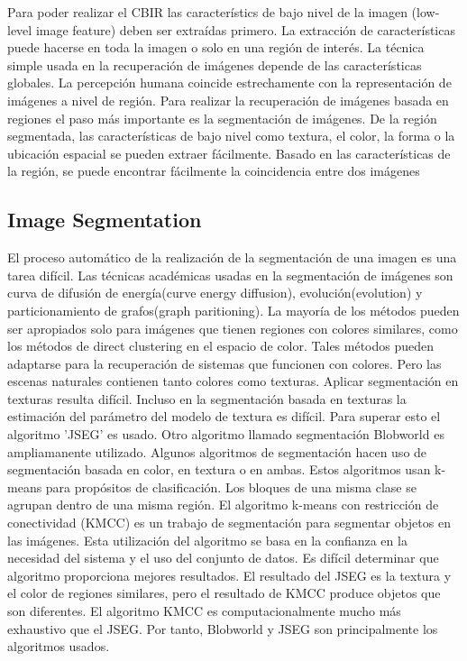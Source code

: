 \documentclass{llncs}
\begin{document}
Para poder realizar el CBIR las caracter\'istics de bajo nivel de la imagen  (low-level image feature) deben ser extra\'idas 
primero. La extracci\'on de caracter\'isticas puede hacerse en toda la imagen o solo en una regi\'on de inter\'es. La t\'ecnica
simple usada en la recuperaci\'on de im\'agenes depende de las caracter\'isticas globales. La percepci\'on humana coincide 
estrechamente con la representaci\'on de im\'agenes a nivel de regi\'on. Para realizar la recuperaci\'on de im\'agenes 
basada en regiones el paso m\'as importante es la segmentaci\'on de im\'agenes. De la regi\'on segmentada, las caracter\'isticas 
de bajo nivel como textura, el color, la forma o la ubicaci\'on espacial se pueden extraer f\'acilmente. Basado en las caracter\'isticas
de la regi\'on, se puede encontrar f\'acilmente la coincidencia entre dos im\'agenes 

\subsection{ Image Segmentation}
El proceso autom\'atico de la realizaci\'on de la segmentaci\'on de una imagen es una tarea dif\'icil. Las t\'ecnicas acad\'emicas 
usadas en la segmentaci\'on de im\'agenes son curva de  difusi\'on de energ\'ia(curve energy diffusion), evoluci\'on(evolution) y particionamiento 
de grafos(graph paritioning). La mayor\'ia de los m\'etodos pueden ser apropiados solo para im\'agenes que tienen regiones con colores
similares, como los m\'etodos de direct clustering en el espacio de color. Tales m\'etodos pueden adaptarse para la recuperaci\'on de sistemas 
que funcionen con colores. Pero las escenas naturales contienen tanto colores como texturas. Aplicar segmentaci\'on en texturas resulta 
dif\'icil. Incluso en la segmentaci\'on basada en texturas la estimaci\'on del par\'ametro del modelo de textura es dif\'icil. Para 
superar esto el algoritmo 'JSEG' es usado. Otro algoritmo llamado segmentaci\'on Blobworld es ampliamanente utilizado. Algunos algoritmos 
de segmentaci\'on hacen uso de segmentaci\'on basada en color, en textura o en ambas. Estos algoritmos usan k-means para prop\'ositos de 
clasificaci\'on. Los bloques de una misma clase se agrupan dentro de una misma regi\'on. El algoritmo k-means con restricci\'on de 
conectividad (KMCC) es un trabajo de segmentaci\'on para segmentar objetos en las im\'agenes. Esta utilizaci\'on del algoritmo  se basa 
en la confianza en la necesidad del sistema y el uso del conjunto de datos. Es dif\'icil determinar que algoritmo proporciona mejores 
resultados. El resultado del JSEG es la textura y el color de regiones similares, pero el resultado de KMCC produce objetos que son diferentes.
El algoritmo KMCC es computacionalmente mucho m\'as exhaustivo que el JSEG. Por tanto, Blobworld y JSEG son principalmente los algoritmos usados.
\end{document}
